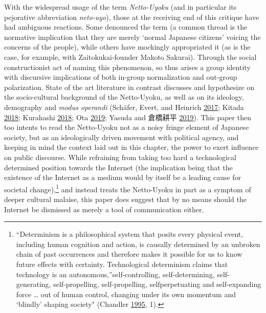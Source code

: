 \documentclass[10pt,british,A4paper,,openany]{memoir}
\begin{document}
With the widespread usage of the term \emph{Netto-Uyoku} (and in
particular its pejorative abbreviation \emph{neto-uyo}), those at the
receiving end of this critique have had ambiguous reactions. Some
denounced the term (a common thread is the normative implication that
they are merely `normal Japanese citizens' voicing the concerns of the
people), while others have mockingly appropriated it (as is the case,
for example, with Zaitokukai-founder Makoto Sakurai). Through the social
constructionist act of naming this phenomenon, so thus arises a group
identity with discursive implications of both in-group normalization and
out-group polarization. State of the art literature in contrast
discusses and hypothesize on the socio-cultural background of the
Netto-Uyoku, as well as on its ideology, demography and \emph{modus
operandi} (Schäfer, Evert, and Heinrich
\protect\hyperlink{ref-schafer_japans_2017}{2017}; Kitada
\protect\hyperlink{ref-kitada_owaranai_2018}{2018}; Kurahashi
\protect\hyperlink{ref-kurahashi_:_2018}{2018}; Ota
\protect\hyperlink{ref-ota_saraba_2019}{2019}; Yasuda and 倉橋耕平
\protect\hyperlink{ref-yasuda_:_2019}{2019}). This paper then too
intents to read the Netto-Uyoku not as a noisy fringe element of
Japanese society, but as an ideologically driven movement with political
agency, and keeping in mind the context laid out in this chapter, the
power to exert influence on public discourse. While refraining from
taking too hard a technological determined position towards the Internet
(the implication being that the existence of the Internet as a medium
would by itself be a leading cause for societal change),\footnote{``Determinism
  is a philosophical system that posits every physical event, including
  human cognition and action, is causally determined by an unbroken
  chain of past occurrences and therefore makes it possible for us to
  know future effects with certainty. Technological determinism claims
  that technology is an autonomous,''self-controlling, self-determining,
  self-generating, self-propelling, self-propelling, selfperpetuating
  and self-expanding force \ldots{} out of human control, changing under
  its own momentum and `blindly' shaping society" (Chandler
  \protect\hyperlink{ref-chandler_act_1995}{1995}, 1).} and instead
treats the Netto-Uyoku in part as a symptom of deeper cultural malaise,
this paper does suggest that by no means should the Internet be
dismissed as merely a tool of communication either.
\end{document}

